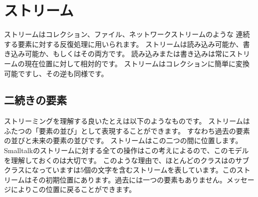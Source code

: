 \documentclass[a4paper,10pt,twoside]{book}
\begin{document}
	\renewcommand{\nnbb}[2]{} %
	\sloppy
\fi
\chapter{ストリーム}



ストリームはコレクション、ファイル、ネットワークストリームのような
連続する要素に対する反復処理に用いられます。
ストリームは読み込み可能か、書き込み可能か、もしくはその両方です。
読み込みまたは書き込みは常にストリームの現在位置に対して相対的です。
ストリームはコレクションに簡単に変換可能ですし、その逆も同様です。



\section{二続きの要素}

ストリーミングを理解する良いたとえは以下のようなものです。
ストリームはふたつの「要素の並び」として表現することができます。
すなわち過去の要素の並びと未来の要素の並びです。
ストリームはこの二つの間に位置します。
Smalltalkのストリームに対する全ての操作はこの考えによるので、このモデルを理解しておくのは大切です。
このような理由で、ほとんどのクラスはのサブクラスになっていますは5個の文字を含むストリームを表しています。このストリームはその初期位置にあります。\ie 過去には一つの要素もありません。メッセージによりこの位置に戻ることができます。
\end{document}
